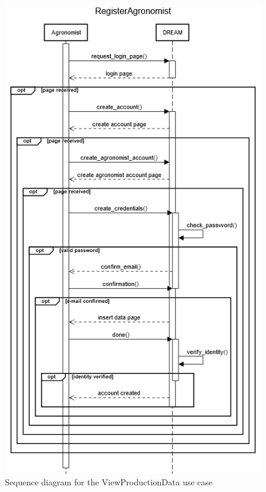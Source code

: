 \documentclass{article}
\begin{document}
\begin{figure}[H]
    \centering
    \includegraphics[scale=0.60]{sequence_diagrams/RegisterAgronomist}
    \caption{Sequence diagram for the ViewProductionData use case}
\end{figure}

\end{document}
